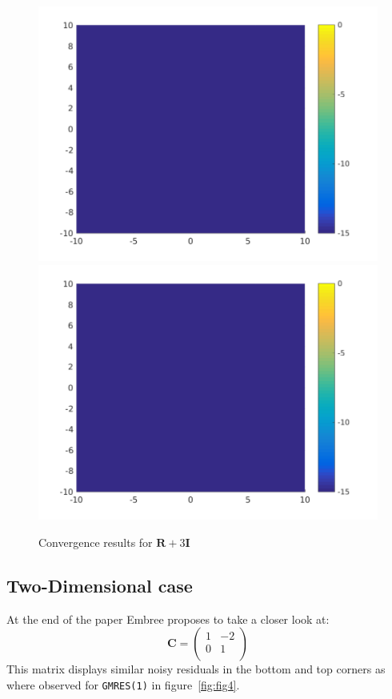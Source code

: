 \begin{figure}
\centering
\includegraphics[width=0.45\linewidth]{../src/figure/randAp3eyeGMRES2}
\includegraphics[width=0.45\linewidth]{../src/figure/randAp3eyeGMRES2}
\caption{Convergence results for $\mathbf{R} + 3\mathbf{I}$}
\label{fig:randAp3eyeGMRES2}
\end{figure}

\subsection{Two-Dimensional case}
At the end of the paper Embree proposes to take a closer look at:
\begin{equation}
\mathbf{C} = \begin{pmatrix}
1 & -2 \\
0 & 1 \\
\end{pmatrix}
\end{equation}
This matrix displays similar noisy residuals in the bottom and top corners as where observed for \texttt{GMRES(1)} in figure~\ref{fig:fig4}.

